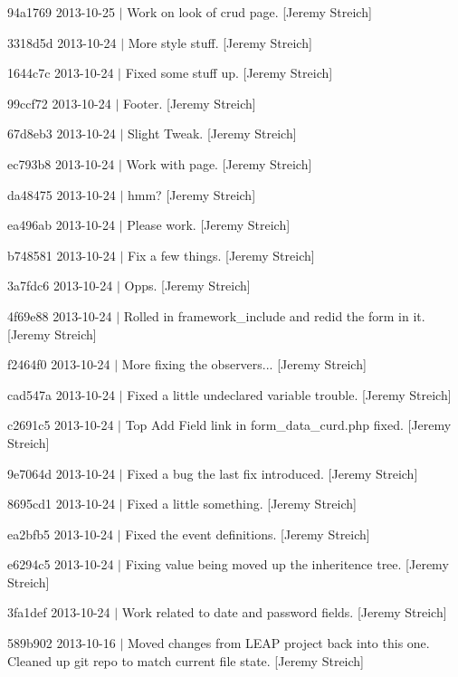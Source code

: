 \begin{DoxyItemize}
\item 94a1769 2013-\/10-\/25 $|$ Work on look of crud page. \mbox{[}Jeremy Streich\mbox{]}
\item 3318d5d 2013-\/10-\/24 $|$ More style stuff. \mbox{[}Jeremy Streich\mbox{]}
\item 1644c7c 2013-\/10-\/24 $|$ Fixed some stuff up. \mbox{[}Jeremy Streich\mbox{]}
\item 99ccf72 2013-\/10-\/24 $|$ Footer. \mbox{[}Jeremy Streich\mbox{]}
\item 67d8eb3 2013-\/10-\/24 $|$ Slight Tweak. \mbox{[}Jeremy Streich\mbox{]}
\item ec793b8 2013-\/10-\/24 $|$ Work with page. \mbox{[}Jeremy Streich\mbox{]}
\item da48475 2013-\/10-\/24 $|$ hmm? \mbox{[}Jeremy Streich\mbox{]}
\item ea496ab 2013-\/10-\/24 $|$ Please work. \mbox{[}Jeremy Streich\mbox{]}
\item b748581 2013-\/10-\/24 $|$ Fix a few things. \mbox{[}Jeremy Streich\mbox{]}
\item 3a7fdc6 2013-\/10-\/24 $|$ Opps. \mbox{[}Jeremy Streich\mbox{]}
\item 4f69e88 2013-\/10-\/24 $|$ Rolled in framework\-\_\-include and redid the form in it. \mbox{[}Jeremy Streich\mbox{]}
\item f2464f0 2013-\/10-\/24 $|$ More fixing the observers... \mbox{[}Jeremy Streich\mbox{]}
\item cad547a 2013-\/10-\/24 $|$ Fixed a little undeclared variable trouble. \mbox{[}Jeremy Streich\mbox{]}
\item c2691c5 2013-\/10-\/24 $|$ Top Add Field link in form\-\_\-data\-\_\-curd.\-php fixed. \mbox{[}Jeremy Streich\mbox{]}
\item 9e7064d 2013-\/10-\/24 $|$ Fixed a bug the last fix introduced. \mbox{[}Jeremy Streich\mbox{]}
\item 8695cd1 2013-\/10-\/24 $|$ Fixed a little something. \mbox{[}Jeremy Streich\mbox{]}
\item ea2bfb5 2013-\/10-\/24 $|$ Fixed the event definitions. \mbox{[}Jeremy Streich\mbox{]}
\item e6294c5 2013-\/10-\/24 $|$ Fixing value being moved up the inheritence tree. \mbox{[}Jeremy Streich\mbox{]}
\item 3fa1def 2013-\/10-\/24 $|$ Work related to date and password fields. \mbox{[}Jeremy Streich\mbox{]}
\item 589b902 2013-\/10-\/16 $|$ Moved changes from L\-E\-A\-P project back into this one. Cleaned up git repo to match current file state. \mbox{[}Jeremy Streich\mbox{]}

\end{DoxyItemize}

